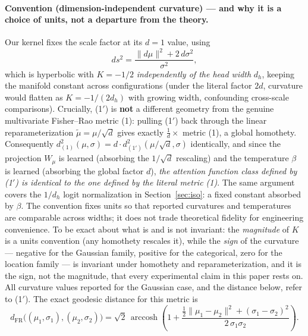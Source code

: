 \documentclass[11pt]{article}
\DeclareMathOperator{\arccosh}{arccosh}
\newcommand{\dFR}{d_{\mathrm{FR}}}
\begin{document}
\paragraph{Convention (dimension-independent curvature) --- and why it is a choice of units, not a departure from the theory.} Our kernel fixes the scale factor at its $d = 1$ value, using
\begin{equation}\tag{1$'$}\label{eq:metric1p}
ds^2 = \frac{\lVert d\mu \rVert^2 + 2\,d\sigma^2}{\sigma^2},
\end{equation}
which is hyperbolic with $K = -1/2$ \emph{independently of the head width} $d_h$, keeping the manifold constant across configurations (under the literal factor $2d$, curvature would flatten as $K = -1/(2d_h)$ with growing width, confounding cross-scale comparisons). Crucially, (1$'$) is \textbf{not} a different geometry from the genuine multivariate Fisher--Rao metric (1): pulling (1$'$) back through the linear reparameterization $\tilde\mu = \mu/\sqrt{d}$ gives exactly $\frac{1}{d}\times$ metric (1), a global homothety. Consequently $d^2_{(1)}(\mu, \sigma) = d \cdot d^2_{(1')}(\mu/\sqrt{d}, \sigma)$ identically, and since the projection $W_\mu$ is learned (absorbing the $1/\sqrt d$ rescaling) and the temperature $\beta$ is learned (absorbing the global factor $d$), \emph{the attention function class defined by (1$'$) is identical to the one defined by the literal metric (1)}. The same argument covers the $1/d_h$ logit normalization in Section~\ref{sec:iso}: a fixed constant absorbed by $\beta$. The convention fixes units so that reported curvatures and temperatures are comparable across widths; it does not trade theoretical fidelity for engineering convenience. To be exact about what is and is not invariant: the \emph{magnitude} of $K$ is a units convention (any homothety rescales it), while the \emph{sign} of the curvature --- negative for the Gaussian family, positive for the categorical, zero for the location family --- is invariant under homothety and reparameterization, and it is the sign, not the magnitude, that every experimental claim in this paper rests on. All curvature values reported for the Gaussian case, and the distance below, refer to (1$'$). The exact geodesic distance for this metric is \cite{costa2015}
\begin{equation}\tag{2}\label{eq:dist}
\dFR\big(({\mu}_1, \sigma_1), ({\mu}_2, \sigma_2)\big) = \sqrt{2}\,\arccosh\!\left(1 + \frac{\tfrac{1}{2}\lVert \mu_1 - \mu_2 \rVert^2 + (\sigma_1 - \sigma_2)^2}{2\,\sigma_1 \sigma_2}\right).
\end{equation}
\end{document}
